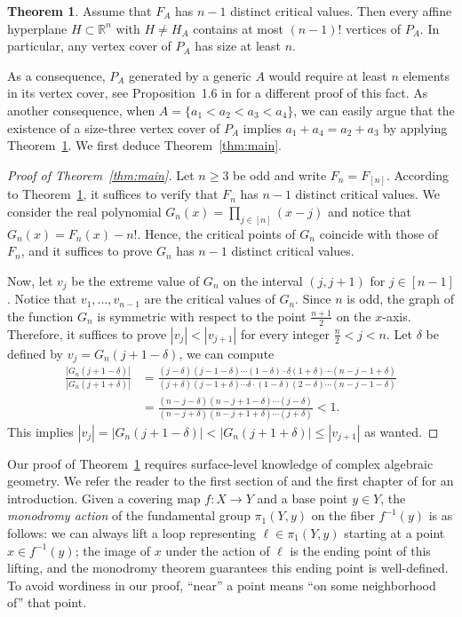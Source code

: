 \documentclass[11pt]{article}
\theoremstyle{definition}
\newtheorem{theorem}{Theorem}
\begin{document}
\begin{theorem}\label{general}
  Assume that $F_A$ has $n-1$ distinct critical values. Then every affine hyperplane $H\subset \mathbb{R}^n$ with $H\neq H_A$ contains at most $(n-1)!$ vertices of $P_A$. In particular, any vertex cover of $P_A$ has size at least $n$.
\end{theorem}

\noindent As a consequence, $P_A$ generated by a generic $A$ would require at least $n$ elements in its vertex cover, see Proposition~1.6 in \cite{huang2021fraction} for a different proof of this fact. As another consequence, when $A = \{a_1<a_2<a_3<a_4\}$, we can easily argue that the existence of a size-three vertex cover of $P_A$ implies $a_1+a_4 = a_2+a_3$ by applying Theorem~\ref{general}. We first deduce Theorem~\ref{thm:main}.

\begin{proof}[Proof of Theorem~\ref{thm:main}]

  Let $n \geq 3$ be odd and write $F_{n} = F_{[n]}$. According to Theorem~\ref{general}, it suffices to verify that $F_n$ has $n-1$ distinct critical values. We consider the real polynomial $G_n(x) = \prod_{j\in [n]} (x-j)$ and notice that $G_n(x) = F_n(x) - n!$. Hence, the critical points of $G_n$ coincide with those of $F_n$, and it suffices to prove $G_n$ has $n-1$ distinct critical values.

  Now, let $v_j$ be the extreme value of $G_n$ on the interval $(j,j+1)$ for $j\in [n-1]$. Notice that $v_1,\dots,v_{n-1}$ are the critical values of $G_n$. Since $n$ is odd, the graph of the function $G_n$ is symmetric with respect to the point $\frac{n+1}{2}$ on the $x$-axis. Therefore, it suffices to prove $|v_{j}| < |v_{j+1}|$ for every integer $\frac{n}{2} < j < n$. Let $\delta$ be defined by $v_j = G_n(j + 1 - \delta)$, we can compute
  \begin{align*}
    \frac{|G_n(j+1 - \delta)|}{|G_n(j+1 + \delta)|} &= \frac{(j-\delta)(j-1-\delta)\cdots(1-\delta)\cdot \delta(1+\delta)\cdots(n-j-1+\delta)}{(j+\delta)(j-1+\delta)\cdots \delta \cdot (1-\delta)(2-\delta)\cdots(n-j-1-\delta)}\\
    &=\frac{(n-j-\delta)(n-j+1-\delta)\cdots(j-\delta)}{(n-j+\delta)(n-j+1+\delta)\cdots(j+\delta)} < 1.
  \end{align*} This implies $|v_{j}| = |G_n(j+1 - \delta)| < |G_n(j+1 + \delta)| \leq |v_{j+1}|$ as wanted.
\end{proof}

Our proof of Theorem~\ref{general} requires surface-level knowledge of complex algebraic geometry. We refer the reader to the first section of \cite{griffiths1978principles} and the first chapter of \cite{forster1981lectures} for an introduction. Given a covering map $f: X \to Y$ and a base point $y \in Y$, the \textit{monodromy action} of the fundamental group $\pi_1(Y,y)$ on the fiber $f^{-1}(y)$ is as follows: we can always lift a loop representing $\ell \in \pi_1(Y,y)$ starting at a point $x \in f^{-1}(y)$; the image of $x$ under the action of $\ell$ is the ending point of this lifting, and the monodromy theorem guarantees this ending point is well-defined. To avoid wordiness in our proof, ``near'' a point means ``on some neighborhood of'' that point.
\end{document}
